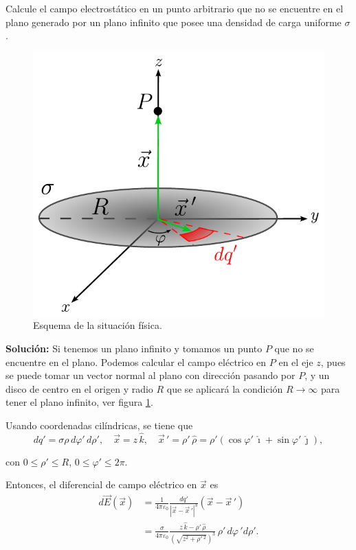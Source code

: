 \begin{ejemplo}
     Calcule el campo electrostático en un punto arbitrario que no se encuentre en el plano generado por un plano infinito que posee una densidad de carga uniforme $\sigma$. 

\begin{figure}[H]
    \centering
    \includegraphics[scale = 0.65]{Figuras/Ej-E-Plano-Infinito.pdf}
    \caption{Esquema de la situación física.}
    \label{fig:Ej-E-Plano-Infinito}
\end{figure}

\textbf{Solución:} Si tenemos un plano infinito y tomamos un punto $P$ que no se encuentre en el plano. Podemos calcular el campo eléctrico en $P$ en el eje $z$, pues se puede tomar un vector normal al plano con dirección pasando por $P$, y un disco de centro en el origen y radio $R$ que se aplicará la condición $R \rightarrow \infty$ para tener el plano infinito, ver figura \ref{fig:Ej-E-Plano-Infinito}.

Usando coordenadas cilíndricas, se tiene que
$$dq' = \sigma \rho \, d\varphi' \,d\rho', \quad \Vec{x} = z \,\hat{k}, \quad \vec{x}\,' = \rho' \,\hat{\rho} = \rho' (\cos \varphi' \,\hat{\imath} + \sin \varphi' \, \hat{\jmath}),$$

con $0 \leq \rho' \leq R$, $0 \leq \varphi ' \leq 2\pi$.

Entonces, el diferencial de campo eléctrico en $\vec{x}$ es
\begin{align*}
    d\Vec{E}(\Vec{x}) &= \frac{1}{4\pi \varepsilon_0} \frac{dq'}{|\vec{x}  - \vec{x}\,'|^3} (\vec{x} - \vec{x}\,') \\
    &=  \frac{\sigma}{4\pi \varepsilon_0} \frac{z \,\hat{k} - \rho' \,\hat{\rho}}{\left( \sqrt{z^2 + \rho'\,^2} \right)^3}\, \rho' \,d\varphi\,' d\rho'.
\end{align*}


\end{ejemplo}
